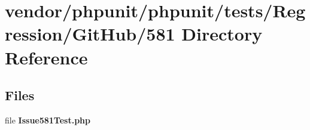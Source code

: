 \section{vendor/phpunit/phpunit/tests/\+Regression/\+Git\+Hub/581 Directory Reference}
\label{dir_7b1e4885c3ad4c0b7fdb9600f6c23608}
\subsection*{Files}
\begin{DoxyCompactItemize}
\item 
file {\bf Issue581\+Test.\+php}
\end{DoxyCompactItemize}
